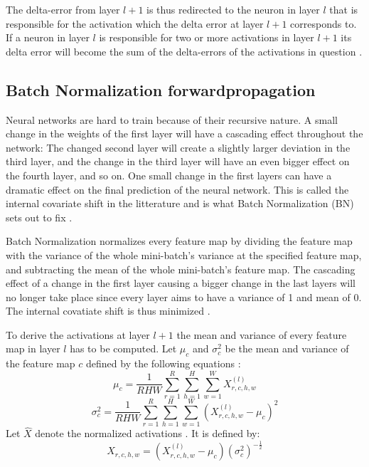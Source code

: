 \documentclass[a4paper, twoside]{article}
\begin{document}
The delta-error from layer $l+1$ is thus redirected to the neuron in layer $l$ that is responsible for the activation which the delta error at layer $l+1$ corresponds to. If a neuron in layer $l$ is responsible for two or more activations in layer $l+1$ its delta error will become the sum of the delta-errors of the activations in question \cite{cs231n} \cite{convmath} \cite{webconv3}. 

\subsection{Batch Normalization forwardpropagation}
Neural networks are hard to train because of their recursive nature. A small change in the weights of the first layer will have a cascading effect throughout the network: The changed second layer will create a slightly larger deviation in the third layer, and the change in the third layer will have an even bigger effect on the fourth layer, and so on. One small change in the first layers can have a dramatic effect on the final prediction of the neural network. This is called  the internal covariate shift in the litterature and is what Batch Normalization (BN) sets out to fix \cite{cs231n} \cite{batchnorm}. 

Batch Normalization normalizes every feature map by dividing the feature map with the variance of the whole mini-batch's variance at the specified feature map, and subtracting the mean of the whole mini-batch's feature map. The cascading effect of a change in the first layer causing a bigger change in the last layers will no longer take place since every layer aims to have a variance of 1 and mean of 0. The internal covatiate shift is thus minimized \cite{cs231n} \cite{batchnorm}. 

To derive the activations at layer $l+1$ the mean and variance of every feature map in layer $l$ has to be computed. Let $\mu_c$ and $\sigma^2_c$ be the mean and variance of the feature map $c$ defined by the following equations \cite{cs231n} \cite{batchnorm}: 
\begin{equation}\label{eqmuc}
\mu_c = \frac{1}{RHW} \sum^{R }_{r=1} \sum^{H }_{h=1} \sum^{W }_{w=1} X^{(l)}_{r,c,h,w}
\end{equation}
\begin{equation}\label{eqsigmac}
\sigma^2_c  = \frac{1}{RHW} \sum^{R }_{r=1} \sum^{H }_{h=1} \sum^{W }_{w=1} ({X^{(l)}_{r,c,h,w} - \mu_c})^2
\end{equation}
Let $\hat{X}$ denote the normalized activations \cite{cs231n} \cite{batchnorm}. It is defined by:
\begin{equation}\label{xhat}
\hat{X}_{r,c,h,w} = (X^{(l)}_{r,c,h,w} - \mu_c){(\sigma^2_c)}^{-\frac{1}{2}}
\end{equation}
\end{document}
